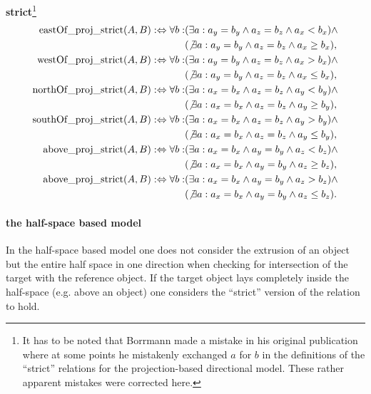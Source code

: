 \documentclass[paper=a4, fontsize=11pt]{scrartcl} %
\numberwithin{equation}{section} %
\numberwithin{figure}{section} %
\numberwithin{table}{section} %
\begin{document}
\textbf{strict}\footnote{It has to be noted that Borrmann made a mistake in his original publication \cite{Borrmann:2009:AEI} where at some points he mistakenly exchanged $a$ for $b$ in the definitions of the ``strict'' relations for the projection-based directional model. These rather apparent mistakes were corrected here.} 
\begin{align*}
  \mathrm{eastOf\_proj\_strict}(A,B) :\Leftrightarrow \forall b:&(\exists a:a_y=b_y\wedge a_z=b_z\wedge a_x<b_x) \wedge \\&(\not\exists a:a_y=b_y\wedge a_z=b_z\wedge a_x\ge b_x), \\
  \mathrm{westOf\_proj\_strict}(A,B) :\Leftrightarrow \forall b:&(\exists a:a_y=b_y\wedge a_z=b_z\wedge a_x>b_x) \wedge \\&(\not\exists a:a_y=b_y\wedge a_z=b_z\wedge a_x\le b_x), \\
  \mathrm{northOf\_proj\_strict}(A,B) :\Leftrightarrow \forall b:&(\exists a:a_x=b_x\wedge a_z=b_z\wedge a_y<b_y) \wedge \\&(\not\exists a:a_x=b_x\wedge a_z=b_z\wedge a_y\ge b_y), \\
 \mathrm{southOf\_proj\_strict}(A,B) :\Leftrightarrow \forall b:&(\exists a:a_x=b_x\wedge a_z=b_z\wedge a_y>b_y) \wedge \\&(\not\exists a:a_x=b_x\wedge a_z=b_z\wedge a_y\le b_y), \\
 \mathrm{above\_proj\_strict}(A,B) :\Leftrightarrow \forall b:&(\exists a:a_x=b_x\wedge a_y=b_y\wedge a_z<b_z) \wedge \\&(\not\exists a:a_x=b_x\wedge a_y=b_y\wedge a_z\ge b_z), \\
 \mathrm{above\_proj\_strict}(A,B) :\Leftrightarrow \forall b:&(\exists a:a_x=b_x\wedge a_y=b_y\wedge a_z>b_z) \wedge \\&(\not\exists a:a_x=b_x\wedge a_y=b_y\wedge a_z\le b_z).
\end{align*}

\paragraph{the half-space based model}\label{sec:half-space-based-model}
In the half-space based model one does not consider the extrusion of an object but the entire half space in one direction when checking for intersection of the target with the reference object. If the target object lays completely inside the half-space (e.g. above an object) one considers the ``strict''  version of the relation to hold. 
\end{document}
